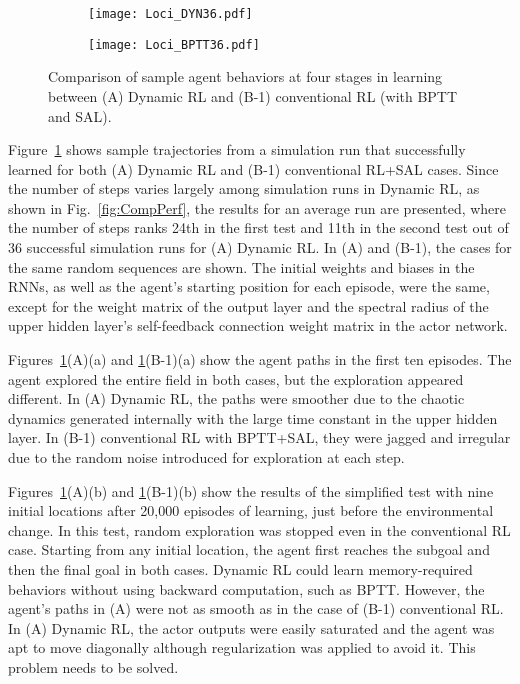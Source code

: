 \begin{figure}[p]
\centering
  \begin{subfigure}[t]{0.45\linewidth}
  \centerline{\texttt{[image: Loci\_DYN36.pdf]}}
  \end{subfigure}
  \begin{subfigure}[t]{0.45\linewidth}
  \centerline{\texttt{[image: Loci\_BPTT36.pdf]}}
  \end{subfigure}
\caption{Comparison of sample agent behaviors at four stages in learning between (A) Dynamic RL and (B-1) conventional RL (with BPTT and SAL).}
\label{fig:Task1_Loci}
\end{figure}
Figure~\ref{fig:Task1_Loci} shows sample trajectories from a simulation run
that successfully learned for both (A) Dynamic RL and (B-1) conventional RL+SAL cases.
Since the number of steps varies largely among simulation runs in Dynamic RL, as shown in Fig.~\ref{fig:CompPerf},
the results for an average run are presented,
where the number of steps ranks 24th in the first test and 11th in the second test
out of 36 successful simulation runs for (A) Dynamic RL.
In (A) and (B-1), the cases for the same random sequences are shown.
The initial weights and biases in the RNNs, as well as the agent's starting position for each episode, were the same,
except for the weight matrix of the output layer and the spectral radius of the upper hidden layer's
self-feedback connection weight matrix in the actor network.
 
Figures~\ref{fig:Task1_Loci}(A)(a) and \ref{fig:Task1_Loci}(B-1)(a) show the agent paths in the first ten episodes.
The agent explored the entire field in both cases, but the exploration appeared different.
In (A) Dynamic RL, the paths were smoother due to the chaotic dynamics generated internally
with the large time constant in the upper hidden layer.
In (B-1) conventional RL with BPTT+SAL, they were jagged and irregular due to the random noise
introduced for exploration at each step.

Figures~\ref{fig:Task1_Loci}(A)(b) and \ref{fig:Task1_Loci}(B-1)(b) show the results of the simplified test
with nine initial locations
after 20,000 episodes of learning, just before the environmental change.
In this test, random exploration was stopped even in the conventional RL case.
Starting from any initial location, the agent first reaches the subgoal and then the final goal in both cases.
Dynamic RL could learn memory-required behaviors without using backward computation, such as BPTT.
However, the agent's paths in (A) were not as smooth as in the case of (B-1) conventional RL.
In (A) Dynamic RL, the actor outputs were easily saturated and
the agent was apt to move diagonally although regularization was applied to avoid it. 
This problem needs to be solved.

